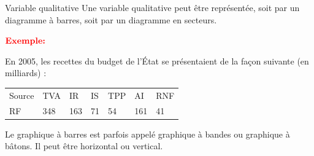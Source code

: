 \documentclass[
  8pt,
  ignorenonframetext,
]{beamer}
\begin{document}
\begin{frame}{Variable qualitative}
Une variable qualitative peut être représentée, soit par un diagramme à
barres, soit par un diagramme en secteurs.\pause

\(\color{red}{\textbf{Exemple:}}\)

En 2005, les recettes du budget de l'État se présentaient de la façon
suivante (en milliards) :

\begin{longtable}[]{@{}lllllll@{}}
\toprule
\endhead
Source & TVA & IR & IS & TPP & AI & RNF \\
RF & 348 & 163 & 71 & 54 & 161 & 41 \\
\bottomrule
\end{longtable}

Le graphique à barres est parfois appelé graphique à bandes ou graphique
à bâtons. Il peut être horizontal ou vertical.

\vspace*{4cm}
\end{frame}
\end{document}
